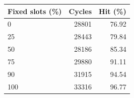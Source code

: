 \begin{tabular}{lrr}
\toprule
Fixed slots (\%) & Cycles & Hit (\%) \\
\midrule
0 & 28801 & 76.92 \\
25 & 28443 & 79.84 \\
50 & 28186 & 85.34 \\
75 & 29880 & 91.11 \\
90 & 31915 & 94.54 \\
100 & 33316 & 96.77 \\
\bottomrule
\end{tabular}
